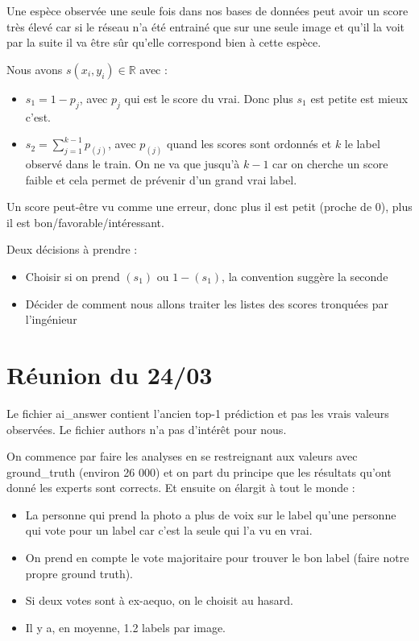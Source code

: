 \documentclass[french]{article}
\begin{document}
\vspace{0.2cm}

Une espèce observée une seule fois dans nos bases de données peut avoir un score très élevé car si le réseau n'a été entrainé que sur une seule image et qu'il la voit par la suite il va être sûr qu'elle correspond bien à cette espèce.

\vspace{0.2cm}

Nous avons $s(x_i, y_i) \in \mathbb R$ avec : 
\begin{itemize}
    \item $s_1 = 1 - p_j$, avec $p_j$ qui est le score du vrai. Donc plus $s_1$ est petite est mieux c'est.
    \item $s_2 = \sum_{j=1}^{k-1} p_{(j)}$, avec $p_{(j)}$ quand les scores sont ordonnés et $k$ le label observé dans le train. On ne va que jusqu'à $k-1$ car on cherche un score faible et cela permet de prévenir d'un grand vrai label.
\end{itemize}

Un score peut-être vu comme une erreur, donc plus il est petit (proche de 0), plus il est bon/favorable/intéressant.

\vspace{0.2cm}

Deux décisions à prendre :
\begin{itemize}
    \item Choisir si on prend $(s_1)$ ou $1-(s_1)$, la convention suggère la seconde
    \item Décider de comment nous allons traiter les listes des scores tronquées par l'ingénieur
\end{itemize}

\section{Réunion du 24/03}

Le fichier ai_answer contient l'ancien top-1 prédiction et pas les vrais valeurs observées.
Le fichier authors n'a pas d'intérêt pour nous.

On commence par faire les analyses en se restreignant aux valeurs avec ground_truth (environ 26 000) et on part du principe que les résultats qu'ont donné les experts sont corrects. Et ensuite on élargit à tout le monde : 
\begin{itemize}
     \item La personne qui prend la photo a plus de voix sur le label qu'une personne qui vote pour un label car c'est la seule qui l'a vu en vrai.
     \item On prend en compte le vote majoritaire pour trouver le bon label (faire notre propre ground truth).
     \item Si deux votes sont à ex-aequo, on le choisit au hasard.
     \item Il y a, en moyenne, 1.2 labels par image.
\end{itemize}
\end{document}
